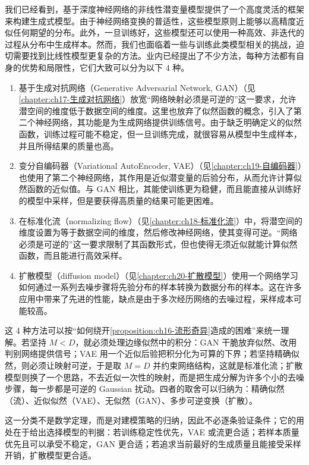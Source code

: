 \documentclass[../../main.tex]{subfiles}
\begin{document}
我们已经看到，基于深度神经网络的非线性潜变量模型提供了一个高度灵活的框架来构建生成式模型。由于神经网络变换的普适性，这些模型原则上能够以高精度近似任何期望的分布。此外，一旦训练好，这些模型还可以使用一种高效、非迭代的过程从分布中生成样本。然而，我们也面临着一些与训练此类模型相关的挑战，迫切需要找到比线性模型更复杂的方法。业内已经提出了不少方法，每种方法都有自身的优势和局限性，它们大致可以分为以下 4 种。
\begin{enumerate}
  \item 基于生成对抗网络（Generative Adversarial Network, GAN）（见\cref{chapter:ch17-生成对抗网络}）放宽“网络映射必须是可逆的”这一要求，允许潜空间的维度低于数据空间的维度。这里也放弃了似然函数的概念，引入了第二个神经网络，其功能是为生成网络提供训练信号。由于缺乏明确定义的似然函数，训练过程可能不稳定，但一旦训练完成，就很容易从模型中生成样本，并且所得结果的质量也高。
  \item 变分自编码器（Variational AutoEncoder, VAE）（见\cref{chapter:ch19-自编码器}）也使用了第二个神经网络，其作用是近似潜变量的后验分布，从而允许计算似然函数的近似值。与 GAN 相比，其能使训练更为稳健，而且能直接从训练好的模型中采样，但是要获得高质量的结果可能更困难。
  \item 在标准化流（normalizing flow）（见\cref{chapter:ch18-标准化流}）中，将潜空间的维度设置为等于数据空间的维度，然后修改神经网络，使其变得可逆。“网络必须是可逆的”这一要求限制了其函数形式，但也使得无须近似就能计算似然函数，而且能进行高效采样。
  \item 扩散模型（diffusion model）（见\cref{chapter:ch20-扩散模型}）使用一个网络学习如何通过一系列去噪步骤将先验分布的样本转换为数据分布的样本。这在许多应用中带来了先进的性能，缺点是由于多次经历网络的去噪过程，采样成本可能较高。
\end{enumerate}

\begin{remark}
这 4 种方法可以按“如何绕开\cref{proposition:ch16-流形奇异}造成的困难”来统一理解。若坚持 $M<D$，就必须处理边缘似然中的积分：GAN 干脆放弃似然、改用判别网络提供信号；VAE 用一个近似后验把积分化为可算的下界；若坚持精确似然，则必须让映射可逆，于是取 $M=D$ 并约束网络结构，这就是标准化流；扩散模型则换了一个思路，不去近似一次性的映射，而是把生成分解为许多个小的去噪步骤，每一步都是可逆的 Gaussian 扰动。四者的取舍可以归纳为：精确似然（流）、近似似然（VAE）、无似然（GAN）、多步可逆变换（扩散）。

这一分类不是数学定理，而是对建模策略的归纳，因此不必逐条验证条件；它的用处在于给出选择模型的判据：若训练稳定性优先，VAE 或流更合适；若样本质量优先且可以承受不稳定，GAN 更合适；若追求当前最好的生成质量且能接受采样开销，扩散模型更合适。
\end{remark}
\end{document}
